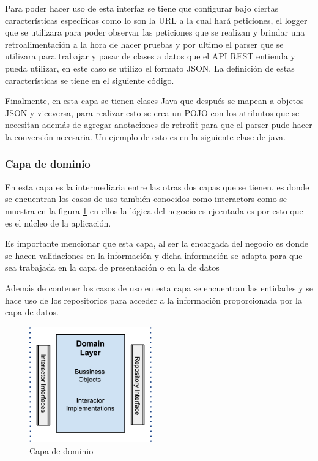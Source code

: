 

Para poder hacer uso de esta interfaz se tiene que configurar bajo ciertas características específicas como lo son la URL a la cual hará peticiones, el logger que se utilizara para poder observar las peticiones que se realizan y brindar una retroalimentación a la hora de hacer pruebas y por ultimo el parser que se utilizara para trabajar y pasar de clases a datos que el API REST entienda y pueda utilizar, en este caso se utilizo el formato JSON. La definición de estas características se tiene en el siguiente código.



Finalmente, en esta capa se tienen clases Java que después se mapean a objetos JSON y viceversa, para realizar esto se crea un POJO con los atributos que se necesitan además de agregar anotaciones de retrofit para que el parser pude hacer la conversión necesaria. Un ejemplo de esto es en la siguiente clase de java.




\subsubsection{Capa de dominio}
En esta capa es la intermediaria entre las otras dos capas que se tienen, es donde se encuentran los casos de uso también conocidos como interactors como se muestra en la figura \ref{fig:capa-dominio} en ellos la lógica del negocio es ejecutada es por esto que es el núcleo de la aplicación.

Es importante mencionar que esta capa, al ser la encargada del negocio es donde se hacen validaciones en la información y dicha información se adapta para que sea trabajada en la capa de presentación o en la de datos

Además de contener los casos de uso en esta capa se encuentran las entidades y se hace uso de los repositorios para acceder a la información proporcionada por la capa de datos.

\begin{figure}[h]
    \centering
    \includegraphics[width=200px]{capitulo5/android/img/capa-dominio.png}
    \caption{Capa de dominio \cite{cleanWay}}
    \label{fig:capa-dominio}
\end{figure}

